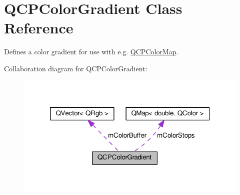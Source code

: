 \hypertarget{class_q_c_p_color_gradient}{}\section{Q\+C\+P\+Color\+Gradient Class Reference}
\label{class_q_c_p_color_gradient}


Defines a color gradient for use with e.\+g. \hyperlink{class_q_c_p_color_map}{Q\+C\+P\+Color\+Map}.  




Collaboration diagram for Q\+C\+P\+Color\+Gradient\+:\nopagebreak
\begin{figure}[H]
\begin{center}
\leavevmode
\includegraphics[width=320pt]{class_q_c_p_color_gradient__coll__graph}
\end{center}
\end{figure}
